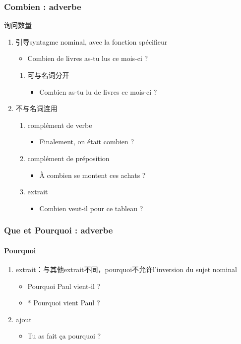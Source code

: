\documentclass[UTF8]{report}
\begin{document}
\subsubsection{Combien : adverbe}
询问数量
\begin{enumerate}
    \item 引导syntagme nominal, avec la fonction spécifieur
    \begin{itemize}
        \item Combien de livres as-tu lus ce mois-ci ?
    \end{itemize}
    \begin{enumerate}
        \item 可与名词分开
        \begin{itemize}
            \item Combien as-tu lu de livres ce mois-ci ?
        \end{itemize}
    \end{enumerate}
    \item 不与名词连用
    \begin{enumerate}
        \item complément de verbe
        \begin{itemize}
            \item Finalement, on était combien ?
        \end{itemize}
        \item complément de préposition
        \begin{itemize}
            \item À combien se montent ces achats ?
        \end{itemize}
        \item extrait
        \begin{itemize}
            \item Combien veut-il pour ce tableau ?
        \end{itemize}
    \end{enumerate}
\end{enumerate}

\subsubsection{Que et Pourquoi : adverbe}


\paragraph{Pourquoi}
\begin{enumerate}
    \item extrait：与其他extrait不同，pourquoi不允许l’inversion du sujet nominal
    \begin{itemize}
        \item Pourquoi Paul vient-il ?
        \item * Pourquoi vient Paul ?
    \end{itemize}
    \item ajout
    \begin{itemize}
        \item Tu as fait ça pourquoi ?
    \end{itemize}
\end{enumerate}
\end{document}
